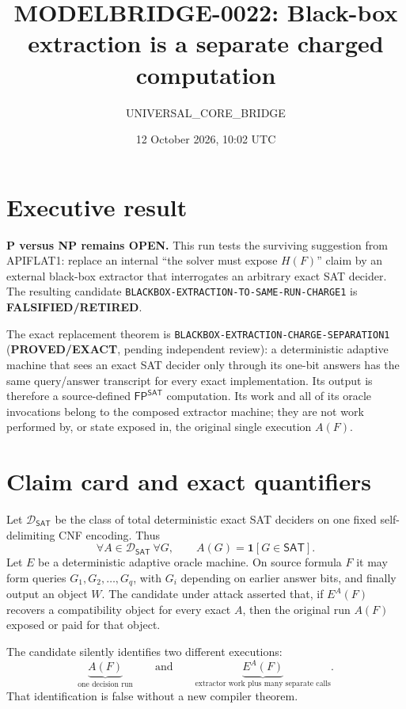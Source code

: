 \documentclass[11pt]{article}
\title{MODELBRIDGE-0022: Black-box extraction is a separate charged computation}
\author{UNIVERSAL\_CORE\_BRIDGE}
\date{12 October 2026, 10:02 UTC}
\newcommand{\SAT}{\mathsf{SAT}}
\newcommand{\EXACT}{\textbf{PROVED/EXACT}}
\newcommand{\RETIRED}{\textbf{FALSIFIED/RETIRED}}
\begin{document}
\maketitle

\section*{Executive result}
\textbf{P versus NP remains OPEN.}  This run tests the surviving suggestion
from APIFLAT1: replace an internal ``the solver must expose $H(F)$'' claim by
an external black-box extractor that interrogates an arbitrary exact SAT
decider.  The resulting candidate
\texttt{BLACKBOX-EXTRACTION-TO-SAME-RUN-CHARGE1} is \RETIRED.

The exact replacement theorem is
\texttt{BLACKBOX-EXTRACTION-CHARGE-SEPARATION1} (\EXACT, pending independent
review): a deterministic adaptive machine that sees an exact SAT decider only
through its one-bit answers has the same query/answer transcript for every
exact implementation.  Its output is therefore a source-defined
$\mathsf{FP}^{\SAT}$ computation.  Its work and all of its oracle invocations
belong to the composed extractor machine; they are not work performed by, or
state exposed in, the original single execution $A(F)$.

\section{Claim card and exact quantifiers}
Let $\mathcal D_{\SAT}$ be the class of total deterministic exact SAT deciders
on one fixed self-delimiting CNF encoding.  Thus
\[
  \forall A\in\mathcal D_{\SAT}\ \forall G,\qquad
  A(G)=\mathbf 1[G\in\SAT].
\]
Let $E$ be a deterministic adaptive oracle machine.  On source formula $F$ it
may form queries $G_1,G_2,\ldots,G_q$, with $G_i$ depending on earlier answer
bits, and finally output an object $W$.  The candidate under attack asserted
that, if $E^A(F)$ recovers a compatibility object for every exact $A$, then the
original run $A(F)$ exposed or paid for that object.

The candidate silently identifies two different executions:
\[
  \underbrace{A(F)}_{\text{one decision run}}
  \qquad\text{and}\qquad
  \underbrace{E^A(F)}_{\text{extractor work plus many separate calls}}.
\]
That identification is false without a new compiler theorem.
\end{document}
